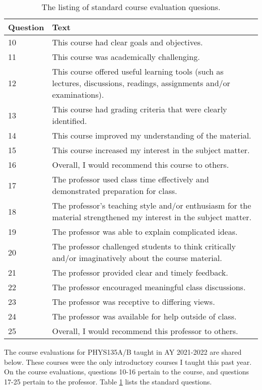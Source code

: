 \documentclass[../../main.tex]{subfiles}
\begin{document}
\begin{table}[ht]
\scriptsize
\centering
\begin{tabular}{| p{1.5cm} | p{15cm} |}
\hline
\hline
Question & Text \\ \hline
10 & This course had clear goals and objectives. \\ \hline
11 & This course was academically challenging. \\ \hline
12 & This course offered useful learning tools (such as lectures, discussions, readings, assignments and/or examinations). \\ \hline
13 & This course had grading criteria that were clearly identified. \\ \hline
14 & This course improved my understanding of the material. \\ \hline
15 & This course increased my interest in the subject matter. \\ \hline
16 & Overall, I would recommend this course to others. \\ \hline
17 & The professor used class time effectively and demonstrated preparation for class. \\ \hline
18 & The professor's teaching style and/or enthusiasm for the material strengthened my interest in the subject matter. \\ \hline
19 & The professor was able to explain complicated ideas. \\ \hline
20 & The professor challenged students to think critically and/or imaginatively about the course material. \\ \hline
21 & The professor provided clear and timely feedback. \\ \hline
22 & The professor encouraged meaningful class discussions. \\ \hline
23 & The professor was receptive to differing views. \\ \hline
24 & The professor was available for help outside of class. \\ \hline
25 & Overall, I would recommend this professor to others. \\ \hline
\hline
\end{tabular}
\caption{\label{tab:questions} The listing of standard course evaluation quesions.}
\end{table}

The course evaluations for PHYS135A/B taught in AY 2021-2022 are shared below.  These courses were the only introductory courses I taught this past year.  On the course evaluations, questions 10-16 pertain to the course, and questions 17-25 pertain to the professor.  Table \ref{tab:questions} lists the standard questions.
\end{document}
